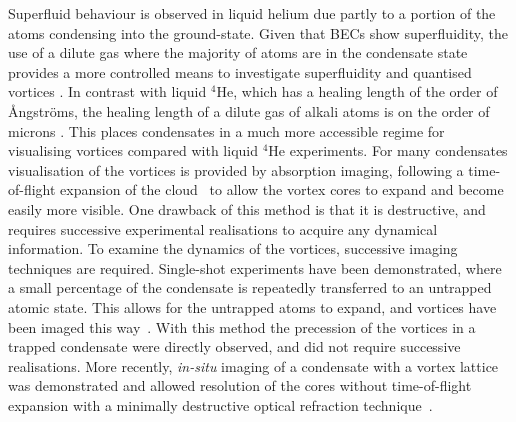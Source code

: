 Superfluid behaviour is observed in liquid helium due partly to a portion of the atoms condensing into the ground-state. Given that BECs show superfluidity, the use of a dilute gas where the majority of atoms are in the condensate state provides a more controlled means to investigate superfluidity and quantised vortices \cite{BK:Ueda_2010,BEC:Srinivasen_pramana_2006,Vtx:Tsubota_arxiv_2010,CT:Tsubota_jpsj_2008}. In contrast with liquid $^4$He, which has a healing length of the order of {\r{A}}ngstr{\"o}ms, the healing length of a dilute gas of alkali atoms is on the order of microns \cite{Vtx:Isoshima_pra_1999}. This places condensates in a much more accessible regime for visualising vortices compared with liquid $^4$He experiments. For many condensates visualisation of the vortices is provided by absorption imaging, following a time-of-flight expansion of the cloud~\cite{Vtx:Raman_prl_2001,VTX:Rankonjac_pra_2016} to allow the vortex cores to expand and become easily more visible. One drawback of this method is that it is destructive, and requires successive experimental realisations to acquire any dynamical information. To examine the dynamics of the vortices, successive imaging techniques are required. Single-shot experiments have been demonstrated, where a small percentage of the condensate is repeatedly transferred to an untrapped atomic state. This allows for the untrapped atoms to expand, and vortices have been imaged this way~\cite{VTX:Freilich_sci_2010}. With this method the precession of the vortices in a trapped condensate were directly observed, and did not require successive realisations. More recently, \textit{in-situ} imaging of a condensate with a vortex lattice was demonstrated and allowed resolution of the cores without time-of-flight expansion with a minimally destructive optical refraction technique~\cite{VTX:Wilson_pra_2015}.


